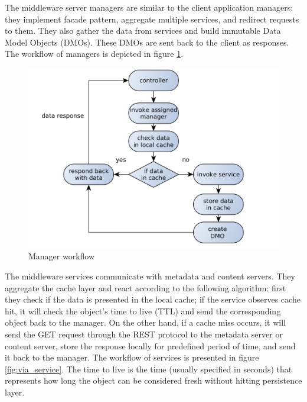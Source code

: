 The middleware server managers are similar to the client application managers: they implement facade pattern, aggregate multiple services, and redirect requests to them. They also gather the data from services and build immutable Data Model Objects (DMOs). These DMOs are sent back to the client as responses. The workflow of managers is depicted in figure \ref{fig:via_manager}.

\begin{figure}[h]
    \centering
	\includegraphics[width=\textwidth]{images/via_manager_1.png}
    \caption{Manager workflow}
    \label{fig:via_manager}
\end{figure}

The middleware services communicate with metadata and content servers. They aggregate the cache layer and react according to the following algorithm: first they check if the data is presented in the local cache; if the service observes cache hit, it will check the object's time to live (TTL) and send the corresponding object back to the manager. On the other hand, if a cache miss occurs, it will send the GET request through the REST protocol to the metadata server or content server, store the response locally for predefined period of time, and send it back to the manager. The workflow of services is presented in figure \ref{fig:via_service}. The time to live is the time (usually specified in seconds) that represents how long the object can be considered fresh without hitting persistence layer.


